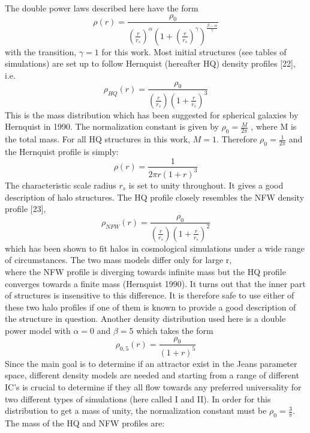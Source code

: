 The double power laws described here have the form
\begin{equation}
\rho(r) = \frac{\rho_0}{(\frac{r}{r_s})^{\alpha}(1+(\frac{r}{r_s})^{\gamma})^\frac{\beta-\alpha}{\gamma}}  
\end{equation}
with the transition, $\gamma=1$ for this work.
Most initial structures (see tables of simulations) are set up to follow Hernquist (hereafter HQ) density profiles [22], i.e. \\
\begin{equation} 
\rho_{HQ}(r) = \frac{\rho_0}{(\frac{r}{r_s})(1+\frac{r}{r_s})^3}  
\end{equation}
This is the mass distribution which has been suggested for spherical galaxies by Hernquist in 1990. The normalization constant is given by $\rho_0 = \frac{M}{2\pi}$ , where M is the total mass. For all HQ structures in this work, $M = 1$. Therefore $\rho_0 = \frac{1}{2\pi}$ and the Hernquist profile is simply:
\begin{equation} 
\rho(r) = \frac{1}{2\pi r(1+r)^3}  
\end{equation}
The characteristic scale radius $r_s $ is set to unity throughout. It gives a good description of halo structures. The HQ profile closely resembles the NFW density profile [23], \\
\begin{equation}
\rho_{NFW}(r) = \frac{\rho_0}{(\frac{r}{r_s})(1+\frac{r}{r_s})^2}  
\end{equation}
which has been shown to fit halos in cosmological simulations under a wide range of circumstances. The two mass models differ only for large r, \\
where the NFW profile is diverging towards infinite mass but the HQ profile converges towards a finite mass (Hernquist 1990). 
It turns out that the inner part of structures is insensitive to this difference. It is therefore safe to use either of these two halo profiles if one of them is known to provide a good description of the structure in question. Another density distribution used here is a double power model with $\alpha = 0$ and $\beta = 5$ which takes the form
\begin{equation} 
\rho_{0,5}(r) = \frac{\rho_0}{(1+r)^5}  
\end{equation}
Since the main goal is to determine if an attractor exist in the Jeans parameter space, different density models are needed and starting from a range of different IC's is crucial to determine if they all flow towards any preferred universality for two different types of simulations (here called I and II). In order for this distribution to get a mass of unity, the normalization constant must be $\rho_0 = \frac{3}{\pi}$. The mass of the HQ and NFW profiles are:
